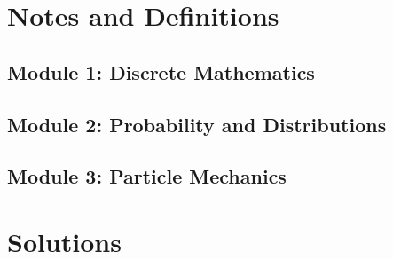 \documentclass{solutionsmannual}
\begin{document}
\part{Notes and Definitions}
\chapter{Module 1: Discrete Mathematics}

\chapter{Module 2: Probability and Distributions}

\chapter{Module 3: Particle Mechanics}


\part{Solutions}
\end{document}
